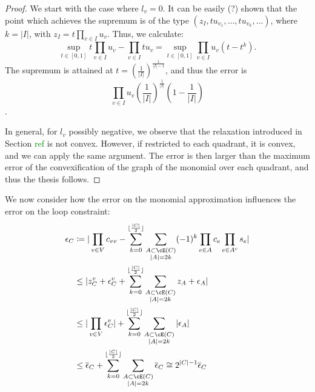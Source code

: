 \documentclass{article}
\begin{document}
  \begin{proof}
  We start with the case where \(l_v = 0\). It can be easily (?) shown that the point which achieves the supremum is of the type \((z_I, tu_{v_1},\ldots, tu_{v_k},\ldots)\), where \(k = |I|\),
  with \(z_I = t\prod_{v \in I}u_v\). Thus, we calculate:
  \[
  \sup_{t \in [0,1]} t\prod_{v \in I}u_v - \prod_{v \in I}tu_v = \sup_{t \in [0,1]} \prod_{v \in I}u_v(t - t^k).
  \]
  The supremum is attained at \(t = \left(\frac{1}{|I|}\right)^{\frac{1}{|I|-1}}\), and thus the error is \[\prod_{v \in I}u_v\left(\frac{1}{|I|}\right)^{\frac{1}{|I|}}\left(1 - \frac{1}{|I|}\right)\].
  
  In general, for \(l_v\) possibly negative, we observe that the relaxation introduced in Section \textcolor{green}{ref} is not convex. However, if restricted to each quadrant, it is convex, and we can apply the same argument. The error is then larger than the maximum error of the convexification of the graph of the monomial over each quadrant, and thus the thesis follows.
  \end{proof}
  
  We now consider how the error on the monomial approximation influences the error on the loop constraint:
\begin{align}
	\epsilon_C &\coloneqq | \prod_{v \in V}c_{vv}- \sum_{k=0}^{\lfloor\frac{|C|}{2}\rfloor}\sum_{\substack{A \subset \cE(C) \\ |A| = 2k}}(-1)^k\prod_{e \in A}c_{e}\prod_{e \in A^c}s_e|\\
	& \leq  |z^v_C + \epsilon^v_{C}+ \sum_{k=0}^{\lfloor\frac{|C|}{2}\rfloor}\sum_{\substack{A \subset \cE(C) \\ |A| = 2k}}z_A + \epsilon_A|\\
	& \leq  |\prod_{v \in V}\epsilon^v_{C}|+ \sum_{k=0}^{\lfloor\frac{|C|}{2}\rfloor}\sum_{\substack{A \subset \cE(C) \\ |A| = 2k}}|\epsilon_A| \\
	& \leq \overline{\epsilon}_C + \sum_{k=0}^{\lfloor\frac{|C|}{2}\rfloor}\sum_{\substack{A \subset \cE(C) \\ |A| = 2k}}\overline{\epsilon}_C \cong 2^{|C|-1}\overline{\epsilon}_C
\end{align}
\end{document}
